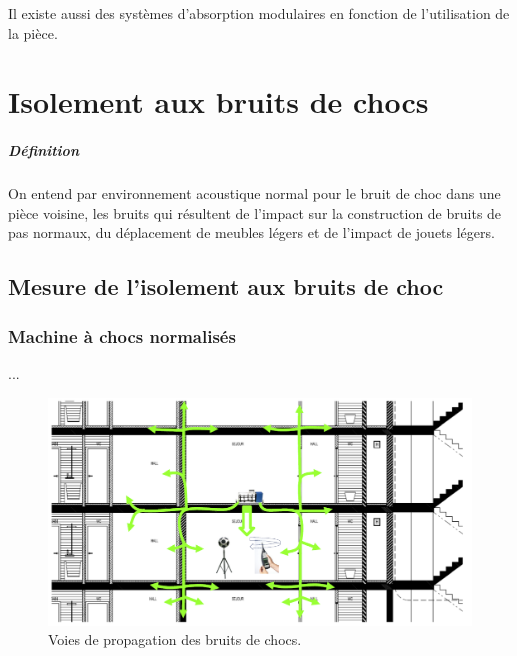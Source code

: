 \documentclass[11pt]{report}
\begin{document}
Il existe aussi des systèmes d'absorption modulaires en fonction de l'utilisation de la pièce.

\chapter{Isolement aux bruits de chocs}
\paragraph{Définition} On entend par environnement acoustique normal pour le bruit de choc dans une pièce voisine, les bruits qui résultent de l'impact sur la construction de bruits de pas normaux, du déplacement de meubles légers et de l'impact de jouets légers.
\section{Mesure de l'isolement aux bruits de choc}
\subsection{Machine à chocs normalisés}
...

\begin{figure}[ht]
\centering
\includegraphics[width=0.8\linewidth]{choc}
\caption{Voies de propagation des bruits de chocs.}
\label{choc}
\end{figure}
\end{document}
